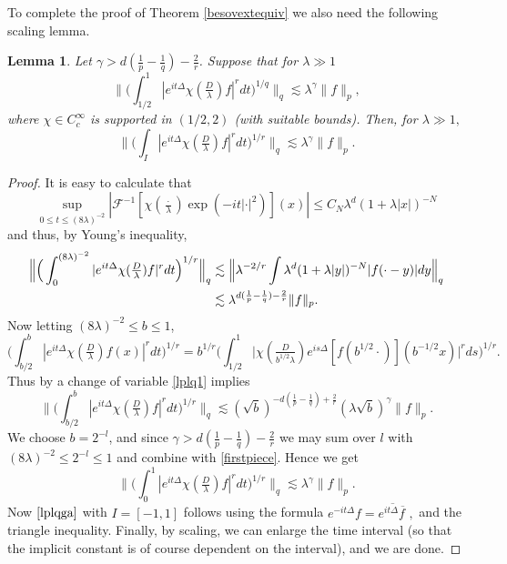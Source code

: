 \documentclass[11pt]{amsart}
\newtheorem{lemma}[theorem]{Lemma}
\theoremstyle{definition}
\numberwithin{theorem}{section}
\numberwithin{definition}{section}
\numberwithin{equation}{section}
\newcommand{\Be}{\begin{equation}}
\newcommand{\Ee}{\end{equation}}
\renewcommand{\le}{\leqslant}
\def\lc{\lesssim}
\def\la{\lambda}             \def\La{\Lambda}
\def\cF{{\mathcal {F}}}
\renewcommand{\le}{\leqslant}
\begin{document}
To complete the proof of Theorem \ref{besovextequiv} we also need the following scaling lemma.
\begin{lemma}\label{smallerintervals}
 Let $\gamma>d(\frac 1p-\frac 1q)-\frac 2r$.
Suppose that for  $\la\gg1$ \Be\label{lplq1} \Big\| \Big(\int_{1/2}^1 |
 e^{it\Delta}\chi(\tfrac D\la) f|^r dt\Big)^{1/q}\Big\|_q \lc \la^\gamma
\|f\|_p, \Ee
where $\chi\in C^\infty_c  $ is supported in  $(1/2,2)$ (with
suitable bounds). Then, for  $\la\gg1,$ \Be\label{lplqga} \Big\|
\Big(\int_{I} | e^{it\Delta}\chi(\tfrac D\la) f|^r
dt\Big)^{1/r}\Big\|_q \lc \la^\gamma\|f\|_{p}. \Ee
\end{lemma}

\begin{proof}
 It is easy to calculate that
$$\sup_{0\le t\le (8\la)^{-2}}
|\cF^{-1} [\chi(\tfrac \cdot\la) \exp(-it|\cdot|^2)] (x)| \le C_N \la^d(1+\la|x|)^{-N}
$$ and thus, by Young's inequality,
\begin{align}
\notag\Big\| \Big(\int_0^{(8\la)^{-2}} |
e^{it\Delta}\chi(\tfrac D\la) f|^r dt\Big)^{1/r}\Big\|_q
&\lc \Big\| \la^{-2/r}\int \la^{d}(1+\la|y|)^{-N}|f(\cdot-y)|dy\Big\|_q\\ &\lc
\la^{d(\frac 1p-\frac 1q)-\frac 2r}
\|f\|_p.
\label{firstpiece}
\end{align}
Now letting $(8\la)^{-2}\le b\le 1$,
$$\Big(\int_{b/2}^b |e^{it\Delta }\chi(\tfrac{D}{\la})  f (x)|^r  dt\Big)^{1/r}
=b^{1/r}\Big(\int_{1/2}^1 \Big|\chi(\tfrac{D}{b^{1/2}\la}) e^{is\Delta } [f(b^{1/2}\cdot)]
(b^{-1/2}x)\Big|^r  ds\Big)^{1/r}.$$
Thus by  a change of variable \eqref{lplq1} implies
$$\Big\|\Big(\int_{b/2}^b |e^{it\Delta }\chi(\tfrac{D}{\la})  f |^r  dt\Big)^{1/r}\Big\|_q
\lc (\sqrt b)^{-d(\frac 1p-\frac 1q)+\frac 2r}  (\la\sqrt b)^{\gamma} \|f\|_p.
$$
We choose $b= 2^{-l}$,  and since $\gamma> d(\frac{1}{p}-\frac1q)-\frac2r$ we may
sum over $l$ with $(8\la)^{-2}\le 2^{-l}\le 1$ and combine with
\eqref{firstpiece}. Hence we get
$$ \Big\|
\Big(\int_0^1 |e^{it\Delta }\chi(\tfrac{D}{\la})  f|^r
dt\Big)^{1/r}\Big\|_q \lc \la^\gamma\|f\|_{p}. $$
Now $\eqref{lplqga}$ with $I=[-1,1]$ follows using the formula
$e^{-it\Delta } f= \overline{e^{it\Delta }\overline {f\,}}\,,$ and the triangle inequality. Finally, by scaling,  we can enlarge the time interval (so that the implicit constant is of course dependent on  the interval), and we are done.
\end{proof}
\end{document}
